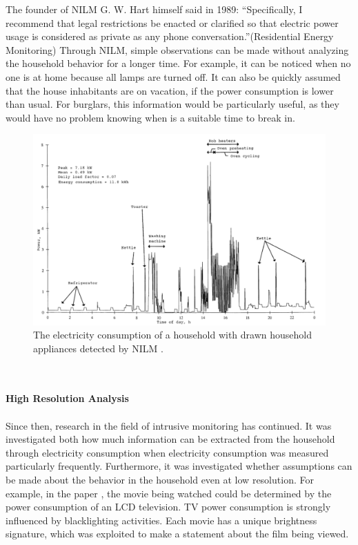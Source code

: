 The founder of \gls{NILM} G. W. Hart himself said in 1989: ``Specifically, I recommend that legal restrictions be enacted or clarified so that electric power usage is considered as private as any phone conversation.''(Residential Energy Monitoring)
Through \gls{NILM}, simple observations can be made without analyzing the household behavior for a longer time. For example, it can be noticed when no one is at home because all lamps are turned off. It can also be quickly assumed that the house inhabitants are on vacation, if the power consumption is lower than usual. For burglars, this information would be particularly useful, as they would have no problem knowing when is a suitable time to break in.
\begin{figure}[tbp]
  \centering
  \includegraphics[width=1\textwidth]{images/nilm.png}
  \caption[Detected NILM Appliances]{The electricity consumption of a household with drawn household appliances detected by \gls{NILM} \cite{quinn2009privacy}.}
  \label{fig:Nilm}
\end{figure}
\\
\\
\textbf{High Resolution Analysis}
\\
\\
Since then, research in the field of intrusive monitoring has continued. It was investigated both how much information can be extracted from the household through electricity consumption when electricity consumption was measured particularly frequently. Furthermore, it was investigated whether assumptions can be made about the behavior in the household even at low resolution.
For example, in the paper \cite{greveler2012multimedia}, the movie being watched could be determined by the power consumption of an LCD television. TV power consumption is strongly influenced by blacklighting activities. Each movie has a unique brightness signature, which was exploited to make a statement about the film being viewed.\\
